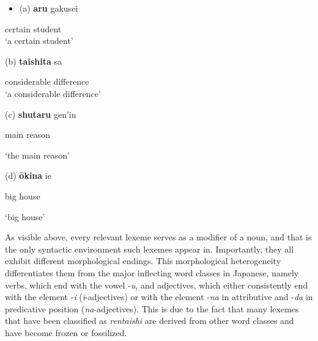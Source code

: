 \documentclass[output=paper]{langscibook}
\begin{document}
\begin{itemize}
\item \begin{styleBeispielCinqueKapitel}
(a) \textbf{aru} gakusei
\end{styleBeispielCinqueKapitel}
\end{itemize}
\begin{styleBeispielCinqueKapitel}
certain student\\
‘a certain student’ 
\end{styleBeispielCinqueKapitel}

\begin{styleBeispielCinqueKapitel}
(b) \textbf{taishita} sa
\end{styleBeispielCinqueKapitel}

\begin{styleBeispielCinqueKapitel}
considerable difference\\
‘a considerable difference’ 
\end{styleBeispielCinqueKapitel}

\begin{styleBeispielCinqueKapitel}
(c) \textbf{shutaru} gen’in
\end{styleBeispielCinqueKapitel}

\begin{styleBeispielCinqueKapitel}
main reason
\end{styleBeispielCinqueKapitel}

\begin{styleBeispielCinqueKapitel}
‘the main reason’ 
\end{styleBeispielCinqueKapitel}

\begin{styleBeispielCinqueKapitel}
(d) \textbf{ōkina} ie
\end{styleBeispielCinqueKapitel}

\begin{styleBeispielCinqueKapitel}
big house
\end{styleBeispielCinqueKapitel}

\begin{styleBeispielCinqueKapitel}
‘big house’ 
\end{styleBeispielCinqueKapitel}

As visible above, every relevant lexeme serves as a modifier of a noun, and that is the only syntactic environment such lexemes appear in. Importantly, they all exhibit different morphological endings. This morphological heterogeneity differentiates them from the major inflecting word classes in Japanese, namely verbs, which end with the vowel -\textit{u}, and adjectives, which either consistently end with the element -\textit{i} (\textit{i}{}-adjectives) or with the element -\textit{na} in attributive and -\textit{da} in predicative position (\textit{na}{}-adjectives). This is due to the fact that many lexemes that have been classified as \textit{rentaishi} are derived from other word classes and have become frozen or fossilized.
\end{document}
